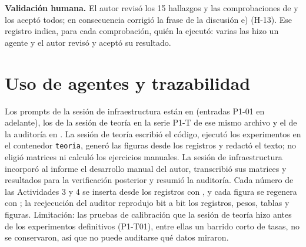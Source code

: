 \documentclass[10pt]{article}
\begin{document}
\textbf{Validación humana.} El autor revisó los 15 hallazgos y las comprobaciones de
 y los aceptó todos; en consecuencia corrigió la frase de la
discusión e) (H-13). Ese registro indica, para cada comprobación, quién la ejecutó: varias las hizo un
agente y el autor revisó y aceptó su resultado.

\section{Uso de agentes y trazabilidad}
Los prompts de la sesión de infraestructura están en  (entradas P1-01 en
adelante), los de la sesión de teoría en la serie P1-T de ese mismo archivo y el de la auditoría en
. La sesión de teoría escribió el código, ejecutó los experimentos en el
contenedor \texttt{teoria}, generó las figuras desde los registros y redactó el texto; no eligió
matrices ni calculó los ejercicios manuales. La sesión de infraestructura incorporó al informe el
desarrollo manual del autor, transcribió sus matrices y resultados para la verificación
posterior y resumió la auditoría. Cada número de las Actividades 3 y 4 se inserta desde los registros
con , y cada figura se regenera con ;
la reejecución del auditor reprodujo bit a bit los registros, pesos, tablas y figuras. Limitación: las
pruebas de calibración que la sesión de teoría hizo antes de los experimentos definitivos (P1-T01),
entre ellas un barrido corto de tasas, no se conservaron, así que no puede auditarse qué datos miraron.

\end{document}
